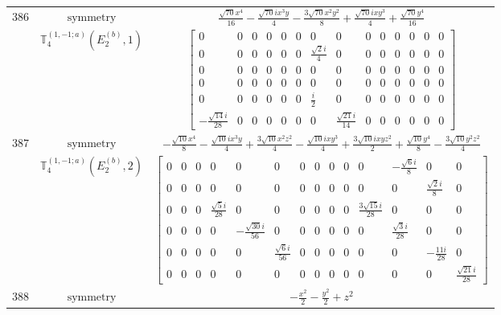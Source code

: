 \documentclass[fleqn,8pt,landscape]{jsarticle}
\begin{document}
\begin{longtable}{ccc}
$ 386 $ & $ \text{symmetry} $ & $ \frac{\sqrt{70} x^{4}}{16} - \frac{\sqrt{70} i x^{3} y}{4} - \frac{3 \sqrt{70} x^{2} y^{2}}{8} + \frac{\sqrt{70} i x y^{3}}{4} + \frac{\sqrt{70} y^{4}}{16} $ \\
$  $ & $ \mathbb{T}_{4}^{(1,-1;a)}(E_{2}^{(b)},1) $ & $ \begin{bmatrix} 0 & 0 & 0 & 0 & 0 & 0 & 0 & 0 & 0 & 0 & 0 & 0 & 0 & 0 \\ 0 & 0 & 0 & 0 & 0 & 0 & \frac{\sqrt{2} i}{4} & 0 & 0 & 0 & 0 & 0 & 0 & 0 \\ 0 & 0 & 0 & 0 & 0 & 0 & 0 & 0 & 0 & 0 & 0 & 0 & 0 & 0 \\ 0 & 0 & 0 & 0 & 0 & 0 & 0 & 0 & 0 & 0 & 0 & 0 & 0 & 0 \\ 0 & 0 & 0 & 0 & 0 & 0 & \frac{i}{2} & 0 & 0 & 0 & 0 & 0 & 0 & 0 \\ - \frac{\sqrt{14} i}{28} & 0 & 0 & 0 & 0 & 0 & 0 & \frac{\sqrt{21} i}{14} & 0 & 0 & 0 & 0 & 0 & 0 \end{bmatrix} $ \\ \hline
$ 387 $ & $ \text{symmetry} $ & $ - \frac{\sqrt{10} x^{4}}{8} - \frac{\sqrt{10} i x^{3} y}{4} + \frac{3 \sqrt{10} x^{2} z^{2}}{4} - \frac{\sqrt{10} i x y^{3}}{4} + \frac{3 \sqrt{10} i x y z^{2}}{2} + \frac{\sqrt{10} y^{4}}{8} - \frac{3 \sqrt{10} y^{2} z^{2}}{4} $ \\
$  $ & $ \mathbb{T}_{4}^{(1,-1;a)}(E_{2}^{(b)},2) $ & $ \begin{bmatrix} 0 & 0 & 0 & 0 & 0 & 0 & 0 & 0 & 0 & 0 & 0 & - \frac{\sqrt{6} i}{8} & 0 & 0 \\ 0 & 0 & 0 & 0 & 0 & 0 & 0 & 0 & 0 & 0 & 0 & 0 & \frac{\sqrt{2} i}{8} & 0 \\ 0 & 0 & 0 & \frac{\sqrt{5} i}{28} & 0 & 0 & 0 & 0 & 0 & 0 & \frac{3 \sqrt{15} i}{28} & 0 & 0 & 0 \\ 0 & 0 & 0 & 0 & - \frac{\sqrt{30} i}{56} & 0 & 0 & 0 & 0 & 0 & 0 & \frac{\sqrt{3} i}{28} & 0 & 0 \\ 0 & 0 & 0 & 0 & 0 & \frac{\sqrt{6} i}{56} & 0 & 0 & 0 & 0 & 0 & 0 & - \frac{11 i}{28} & 0 \\ 0 & 0 & 0 & 0 & 0 & 0 & 0 & 0 & 0 & 0 & 0 & 0 & 0 & \frac{\sqrt{21} i}{28} \end{bmatrix} $ \\ \hline
$ 388 $ & $ \text{symmetry} $ & $ - \frac{x^{2}}{2} - \frac{y^{2}}{2} + z^{2} $ \\

\end{longtable}
\end{document}
